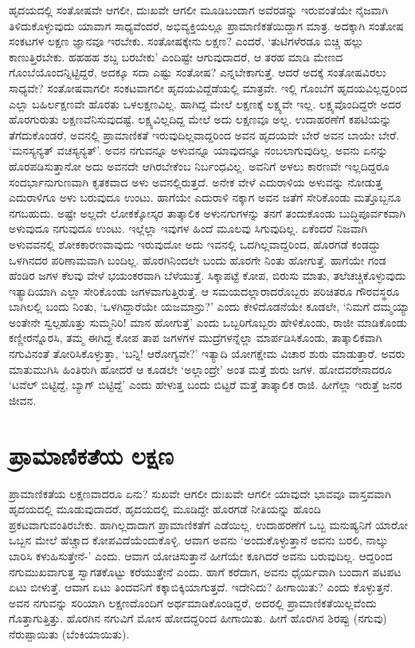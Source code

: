 ಹೃದಯದಲ್ಲಿ ಸಂತೋಷವೇ ಆಗಲೀ, ದುಃಖವೇ ಆಗಲೀ ಮೂಡಿಬಂದಾಗ ಅವೆರಡನ್ನು ಇರುವಂತೆಯೇ ನೈಜವಾಗಿ ತಿಳಿದುಕೊಳ್ಳುವುದು ಯಾವಾಗ ಸಾಧ್ಯವೆಂದರೆ, ಅಭಿವ್ಯಕ್ತಿಯಲ್ಲೂ ಪ್ರಾಮಾಣಿಕತೆಯಿದ್ದಾಗ ಮಾತ್ರ. ಅದಕ್ಕಾಗಿ ಸಂತೋಷ ಸಂಕಟಗಳ ಲಕ್ಷಣ ಜ್ಞಾನವೂ ಇರಬೇಕು. ಸಂತೋಷಕ್ಕೇನು ಲಕ್ಷಣ? ಎಂದರೆ, `ತುಟಿಗಳೆರಡೂ ಬಿಚ್ಚಿ ಹಲ್ಲು ಕಾಣುತ್ತಿರಬೇಕು. ಹಹಹಹ ಶಬ್ದ ಬರಬೇಕು' ಎಂದಿಷ್ಟೇ ಆಗುವುದಾದರೆ, ಆ ತರಹ ಮಾಡಿ ಮೇಣದ ಗೊಂಬೆಯೊಂದನ್ನಿಟ್ಟಿದ್ದರೆ, ಅದಕ್ಕೂ ಸದಾ ಎಷ್ಟು ಸಂತೋಷ? ಎನ್ನಬೇಕಾಗುತ್ತೆ. ಆದರೆ ಅದಕ್ಕೆ ಸಂತೋಷವಿರಲು ಸಾಧ್ಯವೇ? ಸಂತೋಷವಾಗಲೀ ಸಂಕಟವಾಗಲೀ ಹೃದಯವಿದ್ದೆಡೆಯಲ್ಲಿ ಮಾತ್ರವೇ. ಇಲ್ಲಿ ಗೊಂಬೆಗೆ ಹೃದಯವಿಲ್ಲದ್ದರಿಂದ ಎಲ್ಲಾ ಬಹಿರ್ಲಕ್ಷಣವೇ ಹೊರತು ಒಳಲಕ್ಷಣವಿಲ್ಲ. ಹಾಗಿದ್ದ ಮೇಲೆ ಲಕ್ಷಣಕ್ಕೆ ಲಕ್ಷ್ಯವೇ ಇಲ್ಲ. ಲಕ್ಷ್ಯವೊಂದಿದ್ದರೇ ಅದರ ಹೊರಗುರುತು ಲಕ್ಷಣವೆನಿಸುವುದಷ್ಟೆ. ಲಕ್ಷ್ಯವಿಲ್ಲದಿದ್ದ ಮೇಲೆ ಅದು ಲಕ್ಷಣವೂ ಅಲ್ಲ. ಉದಾಹರಣೆಗೆ ಕಪಟಿಯನ್ನು ತೆಗೆದುಕೊಂಡರೆ, ಅವನಲ್ಲಿ ಪ್ರಾಮಾಣಿಕತೆ ಇರುವುದಿಲ್ಲವಾದ್ದರಿಂದ ಅವನ ಹೃದಯವೇ ಬೇರೆ ಅವನ ಬಾಯೇ ಬೇರೆ. `ಮನಸ್ಯನ್ಯತ್ ವಚಸ್ಯನ್ಯತ್'. ಅವನ ನಗುವನ್ನೂ ಅಳುವನ್ನೂ ಯಾವುದನ್ನೂ ನಂಬಲಾಗುವುದಿಲ್ಲ. ಅವನು ಏನನ್ನು  ಹೊರಪಡಿಸುತ್ತಾನೋ ಅದು ಅವನದೇ ಆಗಿರಬೇಕೆಂಬ ನಿರ್ಬಂಧವಿಲ್ಲ. ಅವನಿಗೆ ಅಳಲು ಕಾರಣವೇ ಇಲ್ಲದಿದ್ದರೂ ಸಂದರ್ಭಾನುಗುಣವಾಗಿ ಕೃತಕವಾದ ಅಳು ಅವನಲ್ಲಿರುತ್ತದೆ. ಅನೇಕ ವೇಳೆ ಎದುರಾಳಿಯ ಅಳುವನ್ನು ನೋಡುತ್ತ ಎದುರಾಳಿಗೂ ಅಳು ಬರುವುದೂ ಉಂಟು. ಹಾಗೆಯೇ ಎದುರಾಳಿ ನಕ್ಕಾಗ ಅವನ ಜತೆಗೆ ಸೇರಿಕೊಂಡು ಮತ್ತೊಬ್ಬನೂ ನಗಬಹುದು. ಅಷ್ಟೇ ಅಲ್ಲದೇ ಲೋಕಕ್ಕೋಸ್ಕರ ತಾತ್ಕಾಲಿಕ ಅಳುನಗುಗಳನ್ನು ತನಗೆ ತಂದುಕೊಂಡು ಬುದ್ಧಿಪೂರ್ವಕವಾಗಿ ಅಳುವುದೂ ನಗುವುದೂ ಉಂಟು. ಇಲ್ಲೆಲ್ಲಾ ಇವುಗಳ ಹಿಂದೆ ಮೂಲವು ಸಿಗುವುದಿಲ್ಲ. ಏಕೆಂದರೆ ನಿಜವಾಗಿ ಅಳುವವನಲ್ಲಿ ಶೋಕಕಾರಣವಾವುದು ಇರುವುದೋ ಅದು ಇವನಲ್ಲಿ ಒದಗಿಲ್ಲವಾದ್ದರಿಂದ, ಹೊರಗಡೆ ಕಂಡದ್ದು ಒಳಗಿನದರ ಪರಿಣಾಮವಾಗಿ ಬಂದಿಲ್ಲ. ಹೊರಗಿನಿಂದಲೇ ಬಂದು ಹೊರಗೇ ನಿಂತು ಹೋಗುತ್ತೆ. ಹಾಗೆಯೇ ಗಂಡ ಹೆಂಡಿರ ಜಗಳ ಕೆಲವು ವೇಳೆ ಭಯಂಕರವಾಗಿ ಬೆಳೆಯುತ್ತೆ. ಸಿಕ್ಕಾಪಟ್ಟೆ ಕೋಪ, ಬಿರುಸು ಮಾತು, ತಲೆಚಚ್ಚಿಕೊಳ್ಳುವುದು ಇತ್ಯಾದಿಯಾಗಿ ಎಲ್ಲಾ ಸೇರಿಕೊಂಡು ಜಗಳವಾಗುತ್ತಿರುತ್ತೆ. ಆ ಸಮಯದಲ್ಲಾರಾದರೊಬ್ಬರು ಪರಿಚಿತರೂ ಗೌರವಸ್ಥರೂ ಬಾಗಿಲಲ್ಲಿ ಬಂದು ನಿಂತು, `ಒಳಗಿದ್ದಾರೆಯೇ ಯಜಮಾನ್ರು?' ಎಂದು ಕೇಳಿದೊಡನೆಯೇ ಕೂಡಲೇ, `ನಿಮಗೆ ದಮ್ಮಯ್ಯಾ ಅಂತೇನೇ ಸ್ವಲ್ಪಹೊತ್ತು ಸುಮ್ಮನಿರಿ! ಮಾನ ಹೋಗುತ್ತೆ' ಎಂದು ಒಬ್ಬರಿಗೊಬ್ಬರು ಹೇಳಿಕೊಂಡು, ರಾಜೀ ಮಾಡಿಕೊಂಡು ಕಣ್ಣೀರನ್ನೊರಸಿ, ತಮ್ಮ ಈಗಿದ್ದ ಕೋಪ ತಾಪ ಜಗಳಗಳ ಮುದ್ರೆಗಳನ್ನೆಲ್ಲಾ ಮಾರ್ಪಡಿಸಿಕೊಂಡು, ತಾತ್ಕಾಲಿಕವಾಗಿ ನಗುವಿನಂತೆ ತೋರಿಸಿಕೊಳ್ಳುತ್ತಾ, `ಬನ್ನಿ! ಆರೋಗ್ಯವೇ?' ಇತ್ಯಾದಿ ಯೋಗಕ್ಷೇಮ ವಿಚಾರ ಶುರು ಮಾಡುತ್ತಾರೆ. ಅವರು ಮಾತುಮುಗಿಸಿ ಹಿಂತಿರುಗಿ ಹೋದರೆ ಆ ಕೂಡಲೇ `ಅಲ್ಲಾಂದ್ರೇ' ಅಂತ ಮತ್ತೆ ಶುರು ಜಗಳ. ಹೋದವರೇನಾದರೂ `ಟವೆಲ್ ಬಿಟ್ಟಿದ್ದೆ, ಬ್ಯಾಗ್ ಬಿಟ್ಟಿದ್ದೆ' ಎಂದು ಹೇಳುತ್ತ ಬಂದು ಬಿಟ್ಟರೆ ಮತ್ತೆ ತಾತ್ಕಾಲಿಕ ರಾಜಿ. ಹೀಗೆಲ್ಲಾ ಇರುತ್ತೆ ಜನರ ಜೀವನ.

\section*{ಪ್ರಾಮಾಣಿಕತೆಯ ಲಕ್ಷಣ}

ಪ್ರಾಮಾಣಿಕತೆಯ ಲಕ್ಷಣವಾದರೂ ಏನು? ಸುಖವೇ ಆಗಲೀ ದುಃಖವೇ ಆಗಲೀ ಯಾವುದೇ ಭಾವವೂ ವಾಸ್ತವವಾಗಿ ಹೃದಯದಲ್ಲಿ ಮೂಡುವುದಾದರೆ, ಹೃದಯದಲ್ಲಿ ಮೂಡಿದ್ದೇ ಹೊರಗಡೆ ನೀತಿಯನ್ನು ಹೊಂದಿ ಪ್ರಕಟವಾಗುವಂತಿರಬೇಕು. ಹಾಗಿಲ್ಲದಾದಾಗ ಪ್ರಾಮಾಣಿಕತೆಗೆ ಎಡೆಯಿಲ್ಲ. ಉದಾಹರಣೆಗೆ ಒಬ್ಬ ಮನುಷ್ಯನಿಗೆ ಯಾರೋ ಒಬ್ಬನ ಮೇಲೆ ಹೆಚ್ಚಾದ ಕೋಪವಿದೆಯೆಂದುಕೊಳ್ಳಿ. ಆವಾಗ ಅವನು `ಅಂದುಕೊಳ್ಳುತ್ತಾನೆ ಅವನು ಬರಲಿ, ನಾಲ್ಕು ಬಾರಿಸಿ ಕಳುಹಿಸುತ್ತೇನೆ-' ಎಂದು. ಆವಾಗ ಯೋಚಿಸುತ್ತಾನೆ ಹೀಗೆಯೇ ಕೂಗಿದರೆ ಅವನು ಬರುವುದಿಲ್ಲ. ಆದ್ದರಿಂದ ನಗುಮುಖವಾಗುತ್ತ ಸ್ವಾಗತಕೊಟ್ಟು ಕರೆಯುತ್ತೇನೆ ಎಂದು. ಹಾಗೆ ಕರೆದಾಗ, ಅವನು ಧೈರ್ಯವಾಗಿ ಬಂದಾಗ ಪಟಪಟ ಏಟು ಬೀಳುತ್ತೆ. ಆವಾಗ ಏಟು ತಿಂದವನಿಗೆ ಕಕ್ಕಾಬಿಕ್ಕಿಯಾಗುತ್ತದೆ. ಇದೇನಿದು? ಹೀಗಾಯಿತು? ಎಂದು ಕೊಳ್ಳುತ್ತನೆ. ಅವನ ನಗುವನ್ನು ಸರಿಯಾಗಿ ಲಕ್ಷಣದೊಂದಿಗೆ ಅರ್ಥಮಾಡಿಕೊಂಡಿದ್ದರೆ, ಅದರಲ್ಲಿ ಪ್ರಾಮಾಣಿಕತೆಯಿಲ್ಲವೆಂದು ಗೊತ್ತಾಗುತ್ತಿತ್ತು. ಹೊರಗಿನ ನಗುವಿಗೆ ಮೋಸ ಹೋದದ್ದರಿಂದ ಹೀಗಾಯಿತು. ಹೀಗೆ ಹೊರಗಿನ ಶಿರಪ್ಪು (ನಗುವು) ನೆರುಪ್ಪಾಯಿತು (ಬೆಂಕಿಯಾಯಿತು).

